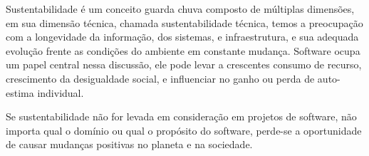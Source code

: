 Sustentabilidade é um conceito guarda chuva composto de múltiplas dimensões, em
sua dimensão técnica, chamada sustentabilidade técnica, temos a preocupação com
a longevidade da informação, dos sistemas, e infraestrutura, e sua adequada
evolução frente as condições do ambiente em constante mudança. Software ocupa
um papel central nessa discussão, ele pode levar a crescentes consumo de
recurso, crescimento da desigualdade social, e influenciar no ganho ou perda de
auto-estima individual.

Se sustentabilidade não for levada em consideração em projetos de software, não
importa qual o domínio ou qual o propósito do software, perde-se a oportunidade
de causar mudanças positivas no planeta e na sociedade.

%
% 
% 
% 
%
%
